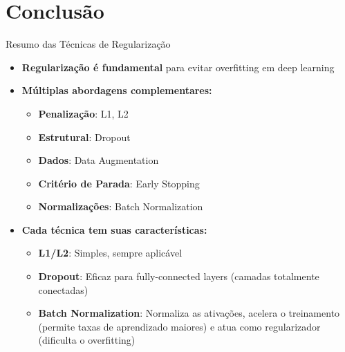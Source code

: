 \documentclass{beamer}
\begin{document}
\section{Conclusão}
\begin{frame}{Resumo das Técnicas de Regularização}
\begin{itemize}
    \item \textbf{Regularização é fundamental} para evitar overfitting em deep learning
    
    \item \textbf{Múltiplas abordagens complementares:}
    \begin{itemize}
        \item \textbf{Penalização}: L1, L2
        \item \textbf{Estrutural}: Dropout
    \item \textbf{Dados}: Data Augmentation
    \item \textbf{Critério de Parada}: Early Stopping
        \item \textbf{Normalizações}: Batch Normalization
    \end{itemize}
    
    \item \textbf{Cada técnica tem suas características:}
    \begin{itemize}
        \item \textbf{L1/L2}: Simples, sempre aplicável
        \item \textbf{Dropout}: Eficaz para fully-connected layers (camadas totalmente conectadas)
  \item \textbf{Batch Normalization}: Normaliza as ativações, acelera o treinamento (permite taxas de aprendizado maiores) e atua como regularizador (dificulta o overfitting)
    \end{itemize}
\end{itemize}
\end{frame}
\end{document}
